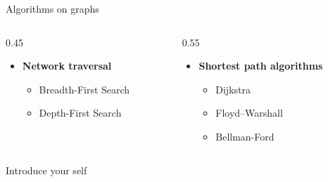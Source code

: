 \documentclass{beamer}
\begin{document}
    \begin{frame}{Algorithms on graphs}
        \begin{columns}[t] %
            \begin{column}{0.45\textwidth}
               \begin{itemize}
                    \item \textbf{Network traversal}
                    \begin{itemize}
                        \item Breadth-First Search
                        \item Depth-First Search
                    \end{itemize}
                \end{itemize}
            \end{column}
            
            \begin{column}{0.55\textwidth}
               \begin{itemize}
                    \item \textbf{Shortest path algorithms}
                    \begin{itemize}
                        \item Dijkstra
                        \item Floyd–Warshall
                        \item Bellman-Ford
                    \end{itemize}
                \end{itemize}
            \end{column}
        \end{columns}

        \begin{note}
            {Introduce your self}
        \end{note}
    \end{frame}
\end{document}
